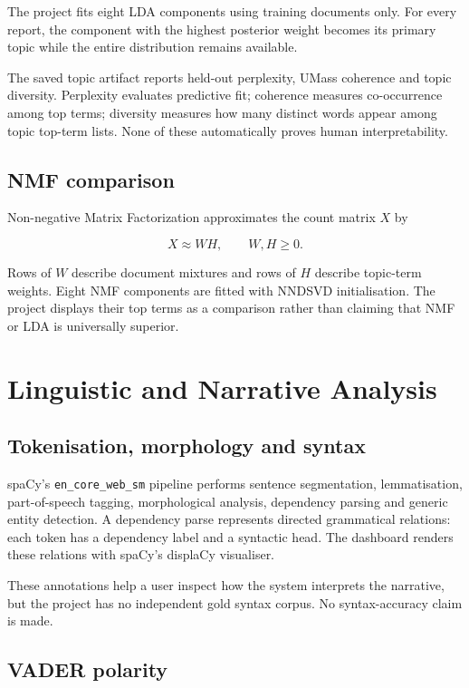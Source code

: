 \documentclass[12pt,a4paper]{report}
\newcommand{\code}[1]{\texttt{#1}}
\begin{document}
The project fits eight LDA components using training documents only. For every report, the component with the highest posterior weight becomes its primary topic while the entire distribution remains available.

The saved topic artifact reports held-out perplexity, UMass coherence and topic diversity. Perplexity evaluates predictive fit; coherence measures co-occurrence among top terms; diversity measures how many distinct words appear among topic top-term lists. None of these automatically proves human interpretability.

\section{NMF comparison}

Non-negative Matrix Factorization approximates the count matrix $X$ by

\begin{equation}
X\approx WH,\qquad W,H\geq0.
\end{equation}

Rows of $W$ describe document mixtures and rows of $H$ describe topic-term weights. Eight NMF components are fitted with NNDSVD initialisation. The project displays their top terms as a comparison rather than claiming that NMF or LDA is universally superior.

\chapter{Linguistic and Narrative Analysis}

\section{Tokenisation, morphology and syntax}

spaCy's \code{en\_core\_web\_sm} pipeline performs sentence segmentation, lemmatisation, part-of-speech tagging, morphological analysis, dependency parsing and generic entity detection. A dependency parse represents directed grammatical relations: each token has a dependency label and a syntactic head. The dashboard renders these relations with spaCy's displaCy visualiser.

These annotations help a user inspect how the system interprets the narrative, but the project has no independent gold syntax corpus. No syntax-accuracy claim is made.

\section{VADER polarity}
\end{document}
